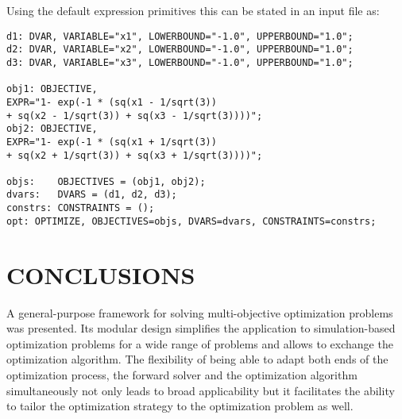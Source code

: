 \documentclass[%
preprint,
preprint,
linenumbers,
amsmath,amssymb,
aps,
prstab,
]{revtex4-1}
\begin{document}
%
Using the default expression primitives this can be stated in an input file
  as:
%

\begin{flushleft}
\begin{Verbatim}[fontsize=\scriptsize]
d1: DVAR, VARIABLE="x1", LOWERBOUND="-1.0", UPPERBOUND="1.0";
d2: DVAR, VARIABLE="x2", LOWERBOUND="-1.0", UPPERBOUND="1.0";
d3: DVAR, VARIABLE="x3", LOWERBOUND="-1.0", UPPERBOUND="1.0";

obj1: OBJECTIVE,
EXPR="1- exp(-1 * (sq(x1 - 1/sqrt(3)) 
+ sq(x2 - 1/sqrt(3)) + sq(x3 - 1/sqrt(3))))";
obj2: OBJECTIVE,
EXPR="1- exp(-1 * (sq(x1 + 1/sqrt(3)) 
+ sq(x2 + 1/sqrt(3)) + sq(x3 + 1/sqrt(3))))";

objs:    OBJECTIVES = (obj1, obj2);
dvars:   DVARS = (d1, d2, d3);
constrs: CONSTRAINTS = ();
opt: OPTIMIZE, OBJECTIVES=objs, DVARS=dvars, CONSTRAINTS=constrs;
\end{Verbatim}
\end{flushleft}



 



\section{CONCLUSIONS} \label{sec:conclusions}

A general-purpose framework for solving multi-objective
  optimization problems was presented.
Its modular design simplifies the application to simulation-based optimization
  problems for a wide range of problems and allows to exchange the
  optimization algorithm.
The flexibility of being able to adapt both ends of the optimization
  process, the forward solver and the optimization algorithm simultaneously
  not only leads to broad applicability but it facilitates the ability to
  tailor the optimization strategy to the optimization problem as well.
\end{document}
